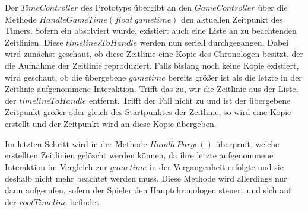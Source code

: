 Der $TimeController$ des Prototyps übergibt an den $GameController$ über die Methode $HandleGameTime(float ~gametime)$ den aktuellen Zeitpunkt des Timers. Sofern ein  absolviert wurde, existiert auch eine Liste an zu beachtenden Zeitlinien. Diese $timelinesToHandle$ werden nun seriell durchgegangen. Dabei wird zunächst geschaut, ob diese Zeitlinie eine Kopie des Chronologen besitzt, der die Aufnahme der Zeitlinie reproduziert. Falls bislang noch keine Kopie existiert, wird geschaut, ob die übergebene $gametime$ bereits größer ist als die letzte in der Zeitlinie aufgenommene Interaktion. Trifft das zu, wir die Zeitlinie aus der Liste, der $timelineToHandle$ entfernt. Trifft der Fall nicht zu und ist der übergebene Zeitpunkt größer oder gleich des Startpunktes der Zeitlinie, so wird eine Kopie erstellt und der Zeitpunkt wird an diese Kopie übergeben.

Im letzten Schritt wird in der Methode $HandlePurge()$ überprüft, welche erstellten Zeitlinien gelöscht werden können, da ihre letzte aufgenommene Interaktion im Vergleich zur $gametime$ in der Vergangenheit erfolgte und sie deshalb nicht mehr beachtet werden muss. Diese Methode wird allerdings nur dann aufgerufen, sofern der Spieler den Hauptchronologen steuert und sich auf der $rootTimeline$ befindet.

